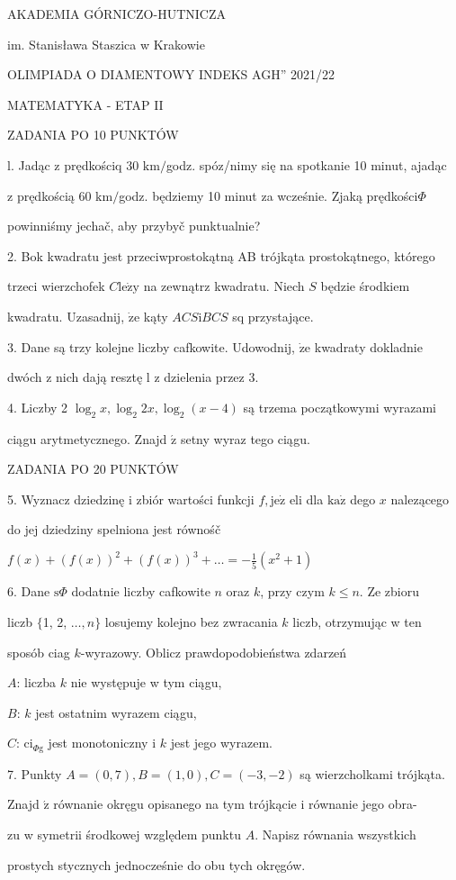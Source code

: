 \documentclass[a4paper,12pt]{article}
\begin{document}
AKADEMIA GÓRNICZO-HUTNICZA

im. Stanisława Staszica w Krakowie

OLIMPIADA O DIAMENTOWY INDEKS AGH'' 2021/22

MATEMATYKA - ETAP II

ZADANIA PO 10 PUNKTÓW

l. Jadąc z prędkościq 30 $\mathrm{k}\mathrm{m}/$godz. spóz/nimy się na spotkanie 10 minut, ajadąc

z prędkością 60 $\mathrm{k}\mathrm{m}/$godz. będziemy 10 minut za wcześnie. Zjaką prędkości$\Phi$

powinniśmy jechač, aby przybyč punktualnie?

2. Bok kwadratu jest przeciwprostokątną AB trójkąta prostokątnego, którego

trzeci wierzchofek $C\mathrm{l}\mathrm{e}\dot{\mathrm{z}}\mathrm{y}$ na zewnątrz kwadratu. Niech $S$ będzie środkiem

kwadratu. Uzasadnij, $\dot{\mathrm{z}}\mathrm{e}$ kąty $ACS\mathrm{i}BCS$ sq przystające.

3. Dane są trzy kolejne liczby cafkowite. Udowodnij, $\dot{\mathrm{z}}\mathrm{e}$ kwadraty dokladnie

dwóch z nich dają resztę l z dzielenia przez 3.

4. Liczby 2 $\log_{2}x, \log_{2}2x, \log_{2}(x-4)$ są trzema początkowymi wyrazami

ciągu arytmetycznego. Znajd $\acute{\mathrm{z}}$ setny wyraz tego ciągu.

ZADANIA PO 20 PUNKTÓW

5. Wyznacz dziedzinę i zbiór wartości funkcji $f, \mathrm{j}\mathrm{e}\dot{\mathrm{z}}$ eli dla $\mathrm{k}\mathrm{a}\dot{\mathrm{z}}$ dego $x$ nalezącego

do jej dziedziny spelniona jest równośč

$f(x)+(f(x))^{2}+(f(x))^{3}+\displaystyle \ldots=-\frac{1}{5}(x^{2}+1)$

6. Dane $\mathrm{s}\Phi$ dodatnie liczby cafkowite $n$ oraz $k$, przy czym $k \leq n$. Ze zbioru

liczb $\{$1, 2, $\ldots, n\}$ losujemy kolejno bez zwracania $k$ liczb, otrzymując w ten

sposób ciag $k$-wyrazowy. Oblicz prawdopodobieństwa zdarzeń

$A$: liczba $k$ nie występuje w tym ciągu,

$B$: $k$ jest ostatnim wyrazem ciągu,

$C$: $\mathrm{c}\mathrm{i}_{\Phi \mathrm{g}}$ jest monotoniczny i $k$ jest jego wyrazem.

7. Punkty $A = (0,7), B = (1,0), C = (-3,-2)$ są wierzcholkami trójkąta.

Znajd $\acute{\mathrm{z}}$ równanie okręgu opisanego na tym trójkącie i równanie jego obra-

zu w symetrii środkowej względem punktu $A$. Napisz równania wszystkich

prostych stycznych jednocześnie do obu tych okręgów.
\end{document}
